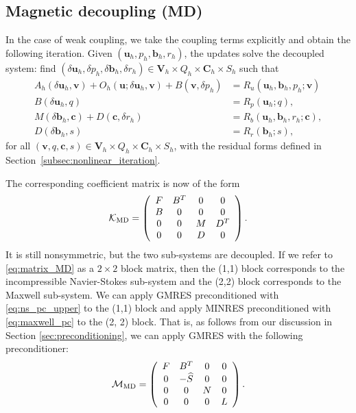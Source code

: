 \documentclass{siamltex}
\newcommand{\uu}[1]{\boldsymbol #1}                     %
\begin{document}
\subsection{Magnetic decoupling (MD)}

In the case of weak coupling, we take the coupling terms explicitly and obtain the following iteration.
Given $(\uu{u}_h,p_h,\uu{b}_h,r_h)$, the updates  solve the decoupled system: find  $(\delta \uu{u}_h,\delta p_h,\delta \uu{b}_h,\delta r_h)\in\uu{V}_h\times Q_h\times \uu{C}_h\times S_h$ such that
\begin{equation}
\label{eq:picard_explicit_C}
\begin{split}
A_h(\delta\uu{u}_h, \uu{v}) +O_h(\uu{u};\delta\uu{u}_h,\uu{v})+ B(\uu{v}, \delta p_h) & = R_u(\uu{u}_h,\uu{b}_h,p_h;\uu{v})\\[.1cm]
B(\delta\uu{u}_h,q)&= R_p(\uu{u}_h;q), \\[.1cm]
M(\delta \uu{b}_h,\uu{c})+
D(\uu{c},\delta r_h)&= R_b(\uu{u}_h,\uu{b}_h,r_h;\uu{c}),\\[.1cm]
D(\delta \uu{b}_h,s)&=R_r(\uu{b}_h;s),
\end{split}
\end{equation}
for all $(\uu{v},q,\uu{c},s)\in\uu{V}_h\times Q_h\times\uu{C}_h\times S_h$, with the residual forms
defined in Section~\ref{subsec:nonlinear_iteration}.

The corresponding coefficient matrix is now of the form
\begin{equation}
\label{eq:matrix_MD}
\mathcal{K}_{\rm MD} =
\left(
\begin{array}{cccc}
F & B^T & 0 & 0\\
B & 0 & 0 & 0 \\
0 & 0 & M & D^T\\
0 & 0 & D & 0
\end{array}
\right).
\end{equation}
It is still nonsymmetric, but the two sub-systems are decoupled. If we refer to \eqref{eq:matrix_MD} as a $2 \times 2$ block matrix, then the (1,1) block corresponds to the incompressible Navier-Stokes sub-system and the (2,2) block corresponds to the Maxwell sub-system. We can apply GMRES preconditioned with \eqref{eq:ns_pc_upper} to the (1,1) block and apply MINRES preconditioned with \eqref{eq:maxwell_pc} to the (2, 2) block. That is, as follows from our discussion in Section \ref{sec:preconditioning}, we can apply GMRES with the following preconditioner:
\begin{equation}
\label{eq:mhd_pc_explicit}
\mathcal{M}_{\rm MD} =
\left(
\begin{array}{cccc}
F & B^T & 0 & 0\\
0 & -\widehat{S} & 0 & 0 \\
0 & 0 & N & 0\\
0 & 0 & 0 & L
\end{array}
\right).
\end{equation}
\end{document}
